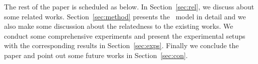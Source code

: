 The rest of the paper is scheduled as below.
In Section~\ref{sec:rel}, we discuss about some related works.
Section~\ref{sec:method} presents the \score~model in detail and we also make some discussion about the relatedness to the existing works.
We conduct some comprehensive experiments and present the experimental setups with the corresponding results in Section~\ref{sec:exps}.
Finally we conclude the paper and point out some future works in Section~\ref{sec:con}.
